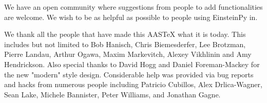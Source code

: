 \documentclass{aastex63}
\begin{document}
We have an open community where suggestions from people to add functionalities are welcome. We wish to be as helpful as possible to people using EinsteinPy in.



























\acknowledgments

We thank all the people that have made this AASTeX what it is today.  This
includes but not limited to Bob Hanisch, Chris Biemesderfer, Lee Brotzman,
Pierre Landau, Arthur Ogawa, Maxim Markevitch, Alexey Vikhlinin and Amy
Hendrickson. Also special thanks to David Hogg and Daniel Foreman-Mackey
for the new "modern" style design. Considerable help was provided via bug
reports and hacks from numerous people including Patricio Cubillos, Alex
Drlica-Wagner, Sean Lake, Michele Bannister, Peter Williams, and Jonathan
Gagne.

%

\vspace{5mm}


\end{document}
